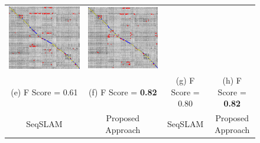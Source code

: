 \documentclass[letterpaper, 10 pt, conference]{ieeeconf}  %
\begin{document}
\begin{figure}[!h]
\begin{tabular*}{\textwidth}[t]{cccc}
  \includegraphics[width=\imgW,height=\imgH]{cta-rail-without-good-110} &
  \includegraphics[width=\imgW,height=\imgH]{cta-rail-with-good-310} \\
  (e) F Score = 0.61 & (f) F Score = \textbf{0.82} & (g) F Score = 0.80 & (h) F Score = \textbf{0.82} \\
  SeqSLAM & Proposed Approach & SeqSLAM & Proposed Approach \\

\end{tabular*}
\end{figure}
\end{document}
